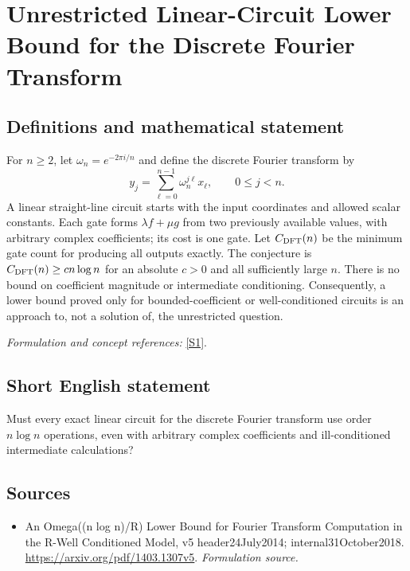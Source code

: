 \documentclass[11pt]{article}
\begin{document}
\section*{\texorpdfstring{Unrestricted Linear-Circuit Lower Bound for the Discrete Fourier Transform}{Unrestricted Linear-Circuit Lower Bound for the Discrete Fourier Transform}}\label{308}
\subsection{Definitions and mathematical statement}
For $n\ge2$, let $\omega_n=e^{-2\pi i/n}$ and define the discrete Fourier transform by
\[
 y_j=\sum_{\ell=0}^{n-1}\omega_n^{j\ell}x_\ell,
 \qquad0\le j<n.
\]
A linear straight-line circuit starts with the input coordinates and allowed scalar constants. Each gate forms $\lambda f+\mu g$ from two previously available values, with arbitrary complex coefficients; its cost is one gate. Let $C_{\rm DFT}(n)$ be the minimum gate count for producing all outputs exactly. The conjecture is $C_{\rm DFT}(n)\ge c n\log n$ for an absolute $c>0$ and all sufficiently large $n$. There is no bound on coefficient magnitude or intermediate conditioning. Consequently, a lower bound proved only for bounded-coefficient or well-conditioned circuits is an approach to, not a solution of, the unrestricted question.
\par\smallskip\textit{Formulation and concept references:} \href{https://arxiv.org/pdf/1403.1307v5}{[S1]}.

\subsection{Short English statement}
Must every exact linear circuit for the discrete Fourier transform use order $n\log n$ operations, even with arbitrary complex coefficients and ill-conditioned intermediate calculations?
\subsection{Sources}
\begin{itemize}
\item[S1]An Omega((n log n)/R) Lower Bound for Fourier Transform Computation in the R-Well Conditioned Model, v5 header24July2014; internal31October2018.
\url{https://arxiv.org/pdf/1403.1307v5}.
\textit{Formulation source.}
\end{itemize}
\end{document}
